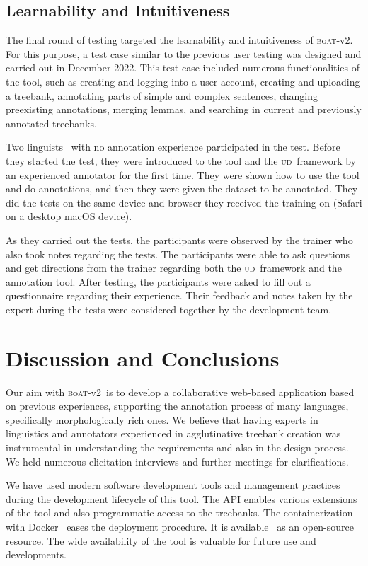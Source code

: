 \documentclass{elektr}
\newcommand{\boatvtwo}{\textsc{b}o\textsc{at}-{\scriptsize v2}}
\newcommand{\ud}{\textsc{ud}}
\begin{document}
\subsection{Learnability and Intuitiveness}
The final round of testing targeted the learnability and intuitiveness of \boatvtwo.
For this purpose, a test case similar to the previous user testing was designed and carried out in December 2022.
This test case included numerous functionalities of the tool, such as creating and logging into a user account, creating and uploading a treebank, annotating parts of simple and complex sentences, changing preexisting annotations, merging lemmas, and searching in current and previously annotated treebanks.

Two linguists~\cite{anon} with no annotation experience participated in the test.
Before they started the test, they were introduced to the tool and the \ud\ framework by an experienced annotator for the first time.
They were shown how to use the tool and do annotations, and then they were given the dataset to be annotated.
They did the tests on the same device and browser they received the training on (Safari on a desktop macOS device).

As they carried out the tests, the participants were observed by the trainer who also took notes regarding the tests.
The participants were able to ask questions and get directions from the trainer regarding both the \ud\ framework and the annotation tool.
After testing, the participants were asked to fill out a questionnaire regarding their experience.
Their feedback and notes taken by the expert during the tests were considered together by the development team.

% 
\section{Discussion and Conclusions}
\label{sec:discussion}

Our aim with \boatvtwo\ is to develop a collaborative web-based application based on previous experiences, supporting the annotation process of many languages, specifically morphologically rich ones.
We believe that having experts in linguistics and annotators experienced in agglutinative treebank creation was instrumental in understanding the requirements and also in the design process.
We held numerous elicitation interviews and further meetings for clarifications.

We have used modern software development tools and management practices during the development lifecycle of this tool.
The API enables various extensions of the tool and also programmatic access to the treebanks.
The containerization with Docker~\cite{docker} eases the deployment procedure.
It is available~\cite{anon} as an open-source resource.
The wide availability of the tool is valuable for future use and developments.
\end{document}
